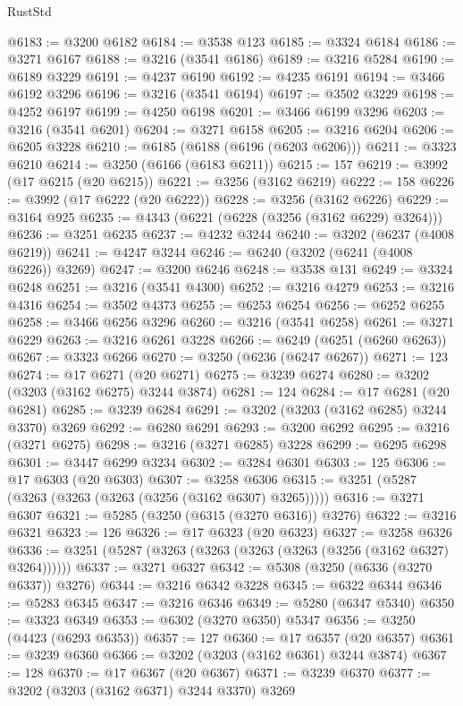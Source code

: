 \begin{lexlean}{RustStd}
\begin{coremodule}
@6183 := @3200 @6182
@6184 := @3538 @123
@6185 := @3324 @6184
@6186 := @3271 @6167
@6188 := @3216 (@3541 @6186)
@6189 := @3216 @5284
@6190 := @6189 @3229
@6191 := @4237 @6190
@6192 := @4235 @6191
@6194 := @3466 @6192 @3296
@6196 := @3216 (@3541 @6194)
@6197 := @3502 @3229
@6198 := @4252 @6197
@6199 := @4250 @6198
@6201 := @3466 @6199 @3296
@6203 := @3216 (@3541 @6201)
@6204 := @3271 @6158
@6205 := @3216 @6204
@6206 := @6205 @3228
@6210 := @6185 (@6188 (@6196 (@6203 @6206)))
@6211 := @3323 @6210
@6214 := @3250 (@6166 (@6183 @6211))
@6215 := 157
@6219 := @3992 (@17 @6215 (@20 @6215))
@6221 := @3256 (@3162 @6219)
@6222 := 158
@6226 := @3992 (@17 @6222 (@20 @6222))
@6228 := @3256 (@3162 @6226)
@6229 := @3164 @925
@6235 := @4343 (@6221 (@6228 (@3256 (@3162 @6229) @3264)))
@6236 := @3251 @6235
@6237 := @4232 @3244
@6240 := @3202 (@6237 (@4008 @6219))
@6241 := @4247 @3244
@6246 := @6240 (@3202 (@6241 (@4008 @6226)) @3269)
@6247 := @3200 @6246
@6248 := @3538 @131
@6249 := @3324 @6248
@6251 := @3216 (@3541 @4300)
@6252 := @3216 @4279
@6253 := @3216 @4316
@6254 := @3502 @4373
@6255 := @6253 @6254
@6256 := @6252 @6255
@6258 := @3466 @6256 @3296
@6260 := @3216 (@3541 @6258)
@6261 := @3271 @6229
@6263 := @3216 @6261 @3228
@6266 := @6249 (@6251 (@6260 @6263))
@6267 := @3323 @6266
@6270 := @3250 (@6236 (@6247 @6267))
@6271 := 123
@6274 := @17 @6271 (@20 @6271)
@6275 := @3239 @6274
@6280 := @3202 (@3203 (@3162 @6275) @3244 @3874)
@6281 := 124
@6284 := @17 @6281 (@20 @6281)
@6285 := @3239 @6284
@6291 := @3202 (@3203 (@3162 @6285) @3244 @3370) @3269
@6292 := @6280 @6291
@6293 := @3200 @6292
@6295 := @3216 (@3271 @6275)
@6298 := @3216 (@3271 @6285) @3228
@6299 := @6295 @6298
@6301 := @3447 @6299 @3234
@6302 := @3284 @6301
@6303 := 125
@6306 := @17 @6303 (@20 @6303)
@6307 := @3258 @6306
@6315 := @3251 (@5287 (@3263 (@3263 (@3263 (@3256 (@3162 @6307) @3265)))))
@6316 := @3271 @6307
@6321 := @5285 (@3250 (@6315 (@3270 @6316)) @3276)
@6322 := @3216 @6321
@6323 := 126
@6326 := @17 @6323 (@20 @6323)
@6327 := @3258 @6326
@6336 := @3251 (@5287 (@3263 (@3263 (@3263 (@3263 (@3256 (@3162 @6327) @3264))))))
@6337 := @3271 @6327
@6342 := @5308 (@3250 (@6336 (@3270 @6337)) @3276)
@6344 := @3216 @6342 @3228
@6345 := @6322 @6344
@6346 := @5283 @6345
@6347 := @3216 @6346
@6349 := @5280 (@6347 @5340)
@6350 := @3323 @6349
@6353 := @6302 (@3270 @6350) @5347
@6356 := @3250 (@4423 (@6293 @6353))
@6357 := 127
@6360 := @17 @6357 (@20 @6357)
@6361 := @3239 @6360
@6366 := @3202 (@3203 (@3162 @6361) @3244 @3874)
@6367 := 128
@6370 := @17 @6367 (@20 @6367)
@6371 := @3239 @6370
@6377 := @3202 (@3203 (@3162 @6371) @3244 @3370) @3269

\end{coremodule}
\end{lexlean}
